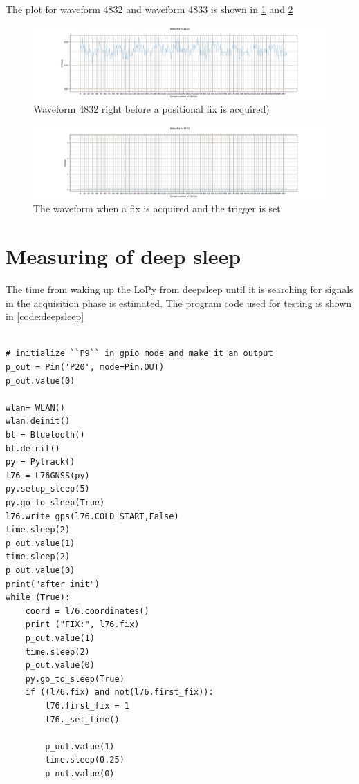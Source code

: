 The plot for waveform 4832 and waveform 4833 is shown in \ref{fig:4832} and \ref{fig:4833}
\begin{figure}[H]
\centering
\includegraphics[width=16 cm]{Project_Report/Images/4832.png}
\caption{Waveform 4832 right before a positional fix is acquired)}
\label{fig:4832}
\end{figure}

\begin{figure}[H]
\centering
\includegraphics[width=16 cm]{Project_Report/Images/4833.png}
\caption{The waveform when a fix is acquired and the trigger is set}
\label{fig:4833}
\end{figure}




\section{Measuring of deep sleep}
The time from waking up the LoPy from deepsleep until it is searching for signals in the acquisition phase is estimated. The program code used for testing is shown in \ref{code:deepsleep}

\lstset{language=Python}          %
\begin{lstlisting}[frame=single,caption = main.py for deepsleep measurement]  % Start your code-block

# initialize ``P9`` in gpio mode and make it an output
p_out = Pin('P20', mode=Pin.OUT)
p_out.value(0)

wlan= WLAN()
wlan.deinit()
bt = Bluetooth()
bt.deinit()
py = Pytrack()
l76 = L76GNSS(py)
py.setup_sleep(5)
py.go_to_sleep(True)
l76.write_gps(l76.COLD_START,False)
time.sleep(2)
p_out.value(1)
time.sleep(2)
p_out.value(0)
print("after init")
while (True):
    coord = l76.coordinates()
    print ("FIX:", l76.fix)
    p_out.value(1)
    time.sleep(2)
    p_out.value(0)
    py.go_to_sleep(True)
    if ((l76.fix) and not(l76.first_fix)):
        l76.first_fix = 1
        l76._set_time()

        p_out.value(1)
        time.sleep(0.25)
        p_out.value(0)
\end{lstlisting}
\label{code:deepsleep}


